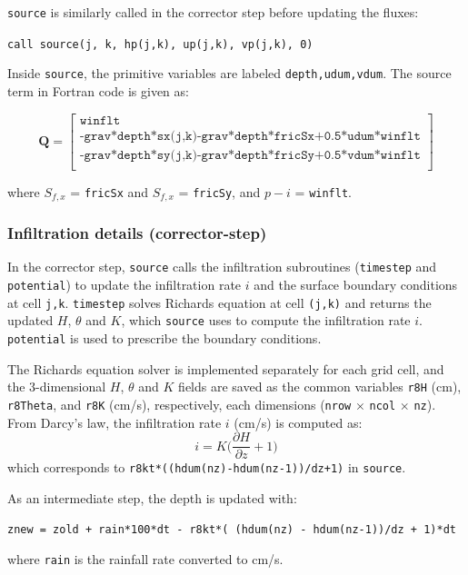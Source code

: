 \documentclass{article}
\newcommand{\code}[1]{\texttt{#1}}
\begin{document}
 
\code{source} is similarly  called in the corrector step before updating the fluxes: 
\begin{center}
\code{call source(j, k, hp(j,k), up(j,k), vp(j,k), 0)}
\end{center}

Inside \code{source}, the primitive variables are labeled \code{depth,udum,vdum}. 
The source term in Fortran code is given as:

\[ \mathbf{Q} = 
 \begin{bmatrix}
	\code{winflt}  \\[.1cm]
	\code{-grav*depth*sx(j,k)-grav*depth*fricSx+0.5*udum*winflt}\\[.1cm]
	\code{-grav*depth*sy(j,k)-grav*depth*fricSy+0.5*vdum*winflt}\\[.1cm]
\end{bmatrix} 
\]

where $S_{f,x}$ = \code{fricSx} and  $S_{f,x}$ = \code{fricSy}, and $p-i$ = \code{winflt}.



\subsubsection*{Infiltration details (corrector-step)}

In the corrector step, \code{source} calls the infiltration subroutines (\code{timestep} and \code{potential}) to update the infiltration rate $i$ and the surface boundary conditions at cell \code{j,k}. 
\code{timestep} solves Richards equation at cell \code{(j,k)} and returns the updated $H$, $\theta$ and $K$, which \code{source} uses to compute the infiltration rate $i$. \code{potential} is used to prescribe the boundary conditions. 

 The Richards equation solver is implemented separately for each grid cell, and the 3-dimensional $H$, $\theta$ and $K$  fields are saved as the common variables \code{r8H} (cm), \code{r8Theta}, and  \code{r8K} (cm/s), respectively, each dimensions (\code{nrow} $\times$ \code{ncol} $\times$ \code{nz}).\\ 

\noindent From Darcy's law, the infiltration rate $i$ (cm/s) is computed as:
$$ i =  K \bigg(\frac{\partial H}{\partial z} + 1\bigg ) $$
which corresponds to \code{r8kt*((hdum(nz)-hdum(nz-1))/dz+1)} in \code{source}.

\noindent  As an intermediate step, the depth is updated with: \\
\begin{center}
\code{znew =  zold + rain*100*dt - r8kt*( (hdum(nz) - hdum(nz-1))/dz + 1)*dt } 	
\end{center}
where \code{rain} is  the rainfall rate converted to cm/s.
\end{document}
